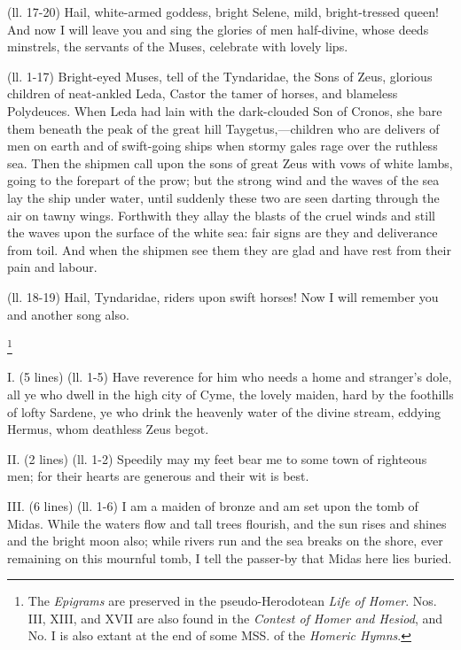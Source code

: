(ll. 17-20) Hail, white-armed goddess, bright Selene, mild, bright-tressed
queen! And now I will leave you and sing the glories of men half-divine, whose
deeds minstrels, the servants of the Muses, celebrate with lovely lips.


(ll. 1-17) Bright-eyed Muses, tell of the Tyndaridae, the Sons of Zeus,
glorious children of neat-ankled Leda, Castor the tamer of horses, and
blameless Polydeuces. When Leda had lain with the dark-clouded Son of Cronos,
she bare them beneath the peak of the great hill Taygetus,—children who
are delivers of men on earth and of swift-going ships when stormy gales rage
over the ruthless sea. Then the shipmen call upon the sons of great Zeus with
vows of white lambs, going to the forepart of the prow; but the strong wind and
the waves of the sea lay the ship under water, until suddenly these two are
seen darting through the air on tawny wings. Forthwith they allay the blasts of
the cruel winds and still the waves upon the surface of the white sea: fair
signs are they and deliverance from toil. And when the shipmen see them they
are glad and have rest from their pain and labour.

(ll. 18-19) Hail, Tyndaridae, riders upon swift horses! Now I will remember you
and another song also.


\footnote{The \emph{Epigrams}
are preserved in the pseudo-Herodotean \emph{Life of Homer}. Nos. III,
XIII, and XVII are also found in the \emph{Contest of Homer and Hesiod},
and No. I is also extant at the end of some MSS. of the \emph{Homeric
Hymns}.}

I. (5 lines) (ll. 1-5) Have reverence for him who needs a home and
stranger’s dole, all ye who dwell in the high city of Cyme, the lovely
maiden, hard by the foothills of lofty Sardene, ye who drink the heavenly water
of the divine stream, eddying Hermus, whom deathless Zeus begot.

II. (2 lines) (ll. 1-2) Speedily may my feet bear me to some town of righteous
men; for their hearts are generous and their wit is best.

III. (6 lines) (ll. 1-6) I am a maiden of bronze and am set upon the tomb of
Midas. While the waters flow and tall trees flourish, and the sun rises and
shines and the bright moon also; while rivers run and the sea breaks on the
shore, ever remaining on this mournful tomb, I tell the passer-by that Midas
here lies buried.

